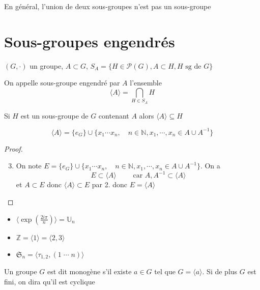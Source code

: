 \begin{rem}
    En général, l'union de deux sous-groupes n'est pas un sous-groupe
\end{rem}

\section{Sous-groupes engendrés}

\begin{thmdef}
    \Hyp $(G, \cdot)$ un groupe, $A\subset G$, $S_A=\{H\in\mathcal P(G), A\subset H, H\text{ sg de }G\}$
    \begin{concenum}
    \item On appelle sous-groupe engendré par $A$ l'ensemble \[
            \langle A\rangle = \bigcap_{H\in S_A}H
        \]
    \item Si $H$ est un sous-groupe de $G$ contenant $A$ alors $\langle A\rangle \subseteq H$
    \item \[
            \langle A\rangle =\{e_G\}\cup \{x_1\cdots x_n, \quad n\in\mathbb N, x_1, \cdots, x_n\in A\cup A^{-1}\}
        \]
    \end{concenum}
\end{thmdef}

\begin{proof}~
    \begin{enumerate}
        \setcounter{enumi}{2}
    \item On note $E=\{e_G\}\cup \{x_1\cdots x_n, \quad n\in\mathbb N, x_1, \cdots, x_n\in A\cup A^{-1}\}$. On a \[
            E\subset \langle A\rangle\qquad \text{ car }A,A^{-1}\subset \langle A\rangle
        \]
        et $A\subset E$ donc $\langle A\rangle \subset E$ par 2. donc $E=\langle A\rangle$
\end{enumerate}
\end{proof}

\begin{ex}
    \begin{itemize}
        \item $\langle \exp \left( \frac{2i\pi}n \right)\rangle=\mathbb U_n$
        \item $\mathbb Z=\langle 1\rangle = \langle 2, 3\rangle$
        \item $\mathfrak S_n=\langle \tau_{1,2}, (1\;\cdots\; n)\rangle$
    \end{itemize}
\end{ex}

\begin{dfn}
    Un groupe $G$ est dit monogène s'il existe $a\in G$ tel que $G=\langle a\rangle$. Si de plus $G$ est fini, on dira qu'il est cyclique
\end{dfn}


